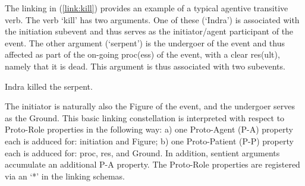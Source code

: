 \documentclass[output=paper,hidelinks]{langscibook}
\begin{document}
The linking in (\ref{link:kill}) provides an example of a typical agentive transitive verb. The verb `kill' has two arguments.  One of these (`Indra') is associated with the initiation subevent and  thus serves as the initiator/agent participant of the event.  The other argument (`serpent') is the undergoer of the event and thus affected as part of the on-going proc(ess) of the event, with a clear res(ult), namely that it is dead.  This argument is thus associated with two subevents. 



\ea \label{link:kill}
Indra killed the serpent.

 \hspace{1.1cm}
\z 

\noindent The initiator is naturally also the Figure of the event, and the undergoer serves as the Ground.  This basic linking constellation is interpreted with respect to Proto-Role properties in the following way:  a) one Proto-Agent (P-A) property each is adduced for:  initiation and Figure; b) one Proto-Patient (P-P) property each is adduced for:  proc, res, and Ground. 
In addition, sentient arguments accumulate an additional P-A property. The Proto-Role properties are registered via an `*' in the linking schemas. 
\end{document}
